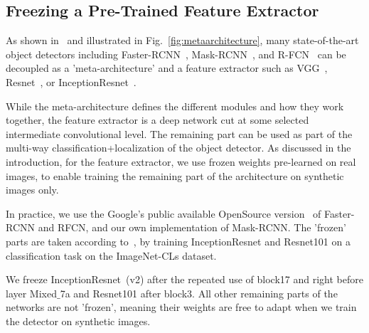 \documentclass[10pt,twocolumn,letterpaper]{article}
\newcommand{\stefan}[1]{{\color{DarkRed}#1}}
\newcommand{\vincentrmk}[1]{{\color{ForestGreen}\bf #1}}
\newcommand{\comment}[1]{}
\begin{document}



\subsection{Freezing a Pre-Trained Feature Extractor}
\label{sec:enabling_synthetic_data}

As shown  in~\cite{Huang17} and illustrated  in Fig.~\ref{fig:metaarchitecture},
many    state-of-the-art    object     detectors    including    
Faster-RCNN~\cite{faster_rcnn},          Mask-RCNN~\cite{mask_rcnn},         and
R-FCN~\cite{rfcn}  can  be decoupled  as  a  'meta-architecture' and  a  feature
extractor     such     as    VGG~\cite{vgg},     Resnet~\cite{resnet101},     or
InceptionResnet~\cite{inception_resnet}.

While  the meta-architecture  defines the  different modules  and how  they work
together,  the  feature  extractor  is  a deep  network  cut  at  some  selected
intermediate convolutional level. The remaining part  can be used as part of the
multi-way classification+localization  of the object detector.   As discussed in
the introduction, for the feature extractor,  we use frozen weights pre-learned on real
images, to  enable training  the remaining part  of the  architecture on  synthetic images
only.




In    practice,   we    use   the    Google's   public    available   OpenSource
version~\cite{Huang17} of  Faster-RCNN and RFCN,  and our own  implementation of
Mask-RCNN. The 'frozen' parts are taken according to~\cite{Huang17}, by training
InceptionResnet  and Resnet101  on  a classification  task  on the  ImageNet-CLs
dataset.
\comment{
\vincentrmk{Can you give more details  on this classification task? Maybe
  a  reference?} The reference is the same as Huang17 - I asked them about details and this is what I got back:
In some cases (VGG, Resnet), where the network originated from outside Google, we convert Caffe weights from the original authors.  In cases where the network was trained within Google like Inception or Mobilenet, then it's always through slim and is equivalent to the imagenet training code that we've released to open source.
}  
We  freeze  InceptionResnet~(v2) after  the  repeated use  of
block17  and right  before layer  Mixed$\_$7a and  Resnet101 after  block3.  All
other remaining  parts of the networks  are not 'frozen', meaning  their weights
are free to adapt when we train the detector on synthetic images.
\end{document}

